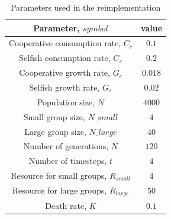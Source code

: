 \documentclass[11pt]{ecsarticle}
\begin{document}
\begin{table}
 \begin{tabular}{|c|c|}\hline
 Parameter, $symbol$ & value \\ \hline
  Cooperative consumption rate, $C_c$	&	$0.1$		\\ \hline
  Selfish consumption rate, $C_s$	&	$0.2$		\\ \hline
  Cooperative growth rate, $G_c$	&	$0.018$		\\ \hline
  Selfish growth rate, $G_s$		&	$0.02$		\\ \hline
  Population size, $N$			&	$4000$		\\ \hline
  Small group size, $N\_small$		&	$4$		\\ \hline
  Large group size, $N\_large$		&	$40$		\\ \hline
  Number of generations, $N$		&	$120$		\\ \hline
  Number of timesteps, $t$		&	$4$		\\ \hline
  Resource for small groups, $R_{small}$&	$4$		\\ \hline
  Resource for large groups, $R_{large}$&	$50$		\\ \hline
  Death rate, $K$			&	$0.1$		\\ \hline
 \end{tabular}
 \caption{Parameters used in the reimplementation}
 \label{table:params}
\end{table}
\end{document}
